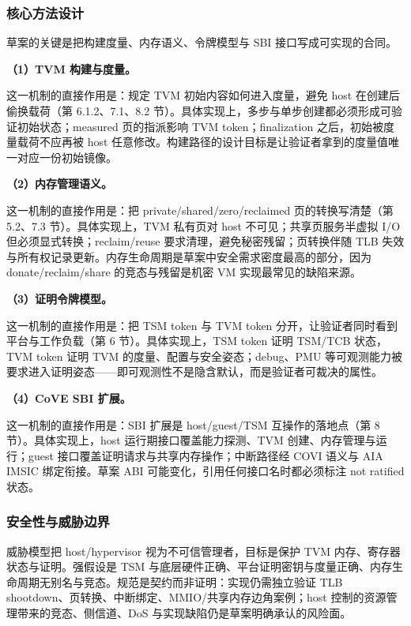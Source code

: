 \documentclass[11pt]{ctexart}
\begin{document}
\subsubsection{核心方法设计}
草案的关键是把构建度量、内存语义、令牌模型与 SBI 接口写成可实现的合同。\par
\noindent\textbf{（1）TVM 构建与度量。}\par
这一机制的直接作用是：规定 TVM 初始内容如何进入度量，避免 host 在创建后偷换载荷（第 6.1.2、7.1、8.2 节）。具体实现上，多步与单步创建都必须形成可验证初始状态；measured 页的指派影响 TVM token；finalization 之后，初始被度量载荷不应再被 host 任意修改。构建路径的设计目标是让验证者拿到的度量值唯一对应一份初始镜像。\par
\noindent\textbf{（2）内存管理语义。}\par
这一机制的直接作用是：把 private/shared/zero/reclaimed 页的转换写清楚（第 5.2、7.3 节）。具体实现上，TVM 私有页对 host 不可见；共享页服务半虚拟 I/O 但必须显式转换；reclaim/reuse 要求清理，避免秘密残留；页转换伴随 TLB 失效与所有权记录更新。内存生命周期是草案中安全需求密度最高的部分，因为 donate/reclaim/share 的竞态与残留是机密 VM 实现最常见的缺陷来源。\par
\noindent\textbf{（3）证明令牌模型。}\par
这一机制的直接作用是：把 TSM token 与 TVM token 分开，让验证者同时看到平台与工作负载（第 6 节）。具体实现上，TSM token 证明 TSM/TCB 状态，TVM token 证明 TVM 的度量、配置与安全姿态；debug、PMU 等可观测能力被要求进入证明姿态——即可观测性不是隐含默认，而是验证者可裁决的属性。\par
\noindent\textbf{（4）CoVE SBI 扩展。}\par
这一机制的直接作用是：SBI 扩展是 host/guest/TSM 互操作的落地点（第 8 节）。具体实现上，host 运行期接口覆盖能力探测、TVM 创建、内存管理与运行；guest 接口覆盖证明请求与共享内存操作；中断路径经 COVI 语义与 AIA IMSIC 绑定衔接。草案 ABI 可能变化，引用任何接口名时都必须标注 not ratified 状态。\par
\subsubsection{安全性与威胁边界}
威胁模型把 host/hypervisor 视为不可信管理者，目标是保护 TVM 内存、寄存器状态与证明。强假设是 TSM 与底层硬件正确、平台证明密钥与度量正确、内存生命周期无别名与竞态。规范是契约而非证明：实现仍需独立验证 TLB shootdown、页转换、中断绑定、MMIO/共享内存边角案例；host 控制的资源管理带来的竞态、侧信道、DoS 与实现缺陷仍是草案明确承认的风险面。\par
\end{document}
